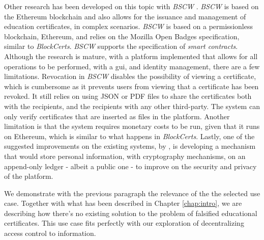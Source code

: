 Other research has been developed on this topic with \emph{BSCW} \cite{grather_blockchain_2018}. \emph{BSCW} is based on the Ethereum blockchain and also allows for the issuance and management of education certificates, in complex scenarios. \emph{BSCW} is based on a permissionless blockchain, Ethereum, and relies on the Mozilla Open Badges specification, similar to \emph{BlockCerts}. \emph{BSCW} supports the specification of \emph{smart contracts}. Although the research is mature, with a platform implemented that allows for all operations to be performed, with a \gls{gui}, and identity management, there are a few limitations. Revocation in \emph{BSCW} disables the possibility of viewing a certificate, which is cumbersome as it prevents users from viewing that a certificate has been revoked. It still relies on using JSON or PDF files to share the certificates both with the recipients, and the recipients with any other third-party. The system can only verify certificates that are inserted as files in the platform. Another limitation is that the system requires monetary costs to be run, given that it runs on Ethereum, which is similar to what happens in \emph{BlockCerts}. Lastly, one of the suggested improvements on the existing systems, by \cite{grather_blockchain_2018} \cite{grather_blockchain_2018}, is developing a mechanism that would store personal information, with cryptography mechanisms, on an append-only ledger - albeit a public one - to improve on the security and privacy of the platform. 

We demonstrate with the previous paragraph the relevance of the the selected use case. Together with what has been described in Chapter \ref{chap:intro}, we are describing how there's no existing solution to the problem of falsified educational certificates. This use case fits perfectly with our exploration of decentralizing access control to information.